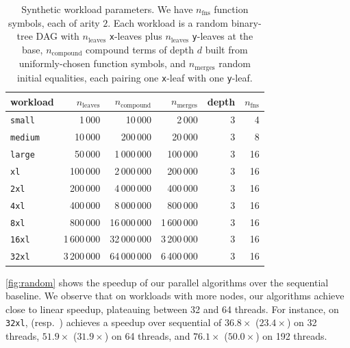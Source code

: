 \begin{table}[t]
  \centering
  \begin{tabular}{l r r r r r}
    \toprule
    workload & $n_{\text{leaves}}$ & $n_{\text{compound}}$ & $n_{\text{merges}}$
    & depth & $n_{\text{fns}}$ \\
    \midrule
    \texttt{small}  &      1\,000 &     10\,000 &      2\,000 & 3 &  4 \\
    \texttt{medium}  &     10\,000 &    200\,000 &     20\,000 & 3 &  8 \\
    \texttt{large}  &     50\,000 &  1\,000\,000 &    100\,000 & 3 & 16 \\
    \texttt{xl}   &    100\,000 &  2\,000\,000 &    200\,000 & 3 & 16 \\
    \texttt{2xl}  &    200\,000 &  4\,000\,000 &    400\,000 & 3 & 16 \\
    \texttt{4xl}  &    400\,000 &  8\,000\,000 &    800\,000 & 3 & 16 \\
    \texttt{8xl}  &    800\,000 & 16\,000\,000 & 1\,600\,000 & 3 & 16 \\
    \texttt{16xl} &  1\,600\,000 & 32\,000\,000 & 3\,200\,000 & 3 & 16 \\
    \texttt{32xl} &  3\,200\,000 & 64\,000\,000 & 6\,400\,000 & 3 & 16 \\
    \bottomrule
  \end{tabular}
  \caption{Synthetic workload parameters. We have $n_{\text{fns}}$ function
  symbols, each of arity $2$. Each workload is a random binary-tree DAG
  with $n_{\text{leaves}}$ \texttt{x}-leaves plus $n_{\text{leaves}}$
  \texttt{y}-leaves at the base, $n_{\text{compound}}$ compound terms of
  depth $d$ built from uniformly-chosen function symbols, and
  $n_{\text{merges}}$ random initial equalities, each pairing one
  \texttt{x}-leaf with one \texttt{y}-leaf.
  }
  \label{tab:workloads}
\end{table}



\autoref{fig:random} shows the speedup of our parallel algorithms over the
sequential baseline. We observe that on workloads with more nodes, our
algorithms achieve close to linear speedup, plateauing between 32 and 64
threads. For instance, on \texttt{32xl}, \filteralgo (resp.\ \parentalgo)
achieves a speedup over sequential of $36.8\times$ ($23.4\times$) on 32
threads, $51.9\times$ ($31.9\times$) on 64 threads, and $76.1\times$
($50.0\times$) on 192 threads.

